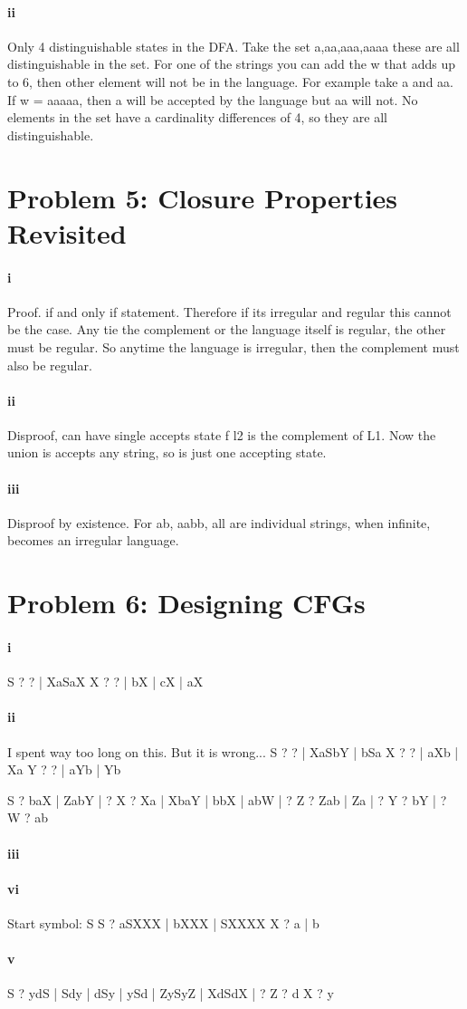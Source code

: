 \documentclass[10pt,letter]{article}
\begin{document}
\paragraph{ii}
Only 4 distinguishable states in the DFA. Take the set {a,aa,aaa,aaaa} these are all distinguishable in the set. For one of the strings you can add the w that adds up to 6, then other element will not be in the language. For example take a and aa. If w = aaaaa, then a will be accepted by the language but aa will not. No elements in the set have a cardinality differences of 4, so they are all distinguishable. 

\section*{Problem 5: Closure Properties Revisited}
\paragraph{i}
Proof. if and only if statement. Therefore if its irregular and regular this cannot be the case. Any tie the complement or the language itself is regular, the other must be regular. So anytime the language is irregular, then the complement must also be regular. 

\paragraph{ii}
Disproof, can have single accepts state f l2 is the complement of L1. Now the union is accepts any string, so is just one accepting state. 

\paragraph{iii}
Disproof by existence. For ab, aabb, all are individual strings, when infinite, becomes an irregular language. 

\section*{Problem 6: Designing CFGs}
\paragraph{i}
S ? ? | XaSaX
X ? ? | bX | cX | aX

\paragraph{ii}
I spent way too long on this. But it is wrong...
S ? ? | XaSbY | bSa
X ? ? | aXb | Xa
Y ? ? | aYb | Yb

S ? baX | ZabY | ?
X ? Xa | XbaY | bbX | abW | ?
Z ? Zab | Za | ?
Y ? bY | ?
W ? ab

\paragraph{iii}


\paragraph{vi}
Start symbol: S
S ? aSXXX | bXXX | SXXXX
X ? a | b

\paragraph{v}
S ? ydS | Sdy | dSy | ySd | ZySyZ | XdSdX | ?
Z ? d
X ? y
\end{document}
